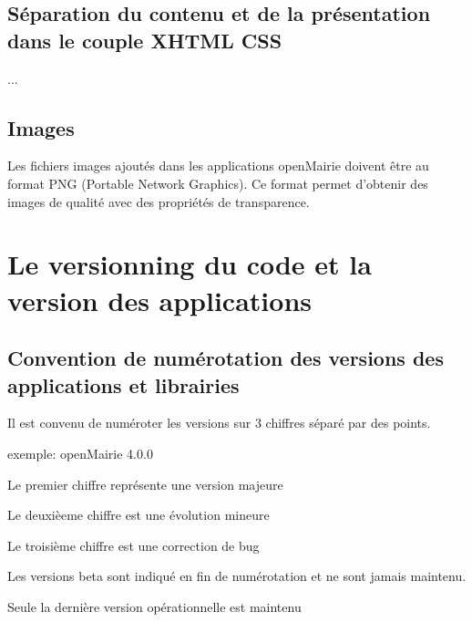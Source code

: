 \documentclass[letterpaper,10pt,french]{manual}
\begin{document}
\resetcurrentobjects
\hypertarget{--doc-regles/separation-contenu-presentation}{}

\hypertarget{separation-contenu-presentation}{}\subsection{Séparation du contenu et de la présentation dans le couple XHTML CSS}

...

\resetcurrentobjects
\hypertarget{--doc-regles/image}{}

\hypertarget{image}{}\subsection{Images}

Les fichiers images ajoutés dans les applications openMairie doivent être au
format PNG (Portable Network Graphics). Ce format permet d'obtenir des images
de qualité avec des propriétés de transparence.

\resetcurrentobjects
\hypertarget{--doc-versions/index}{}

\hypertarget{versions}{}\section{Le versionning du code et la version des applications}

\resetcurrentobjects
\hypertarget{--doc-versions/numerotation}{}

\hypertarget{numerotation}{}\subsection{Convention de numérotation des versions des applications et librairies}

Il est convenu de numéroter les versions sur 3 chiffres séparé par des points.

exemple: openMairie 4.0.0

Le premier chiffre représente une version majeure

Le deuxièeme chiffre est une évolution mineure

Le troisième chiffre est une correction de bug

Les versions beta sont indiqué en fin de numérotation et ne sont jamais maintenu.

Seule la dernière version opérationnelle est maintenu

\resetcurrentobjects
\hypertarget{--doc-versions/svn}{}
\end{document}
